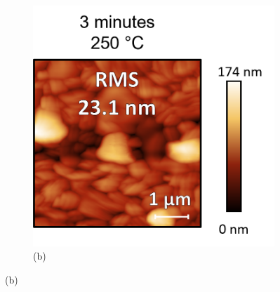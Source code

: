 \begin{figure}[htbp]
\begin{subfigure}[t]{0.4\textwidth}
        \includegraphics[width=\textwidth]{chapters/ellipsometry/image/250C_3min.png} %
        \caption*{(b)}
    \end{subfigure}

    \vspace{1em} %


\end{figure}
